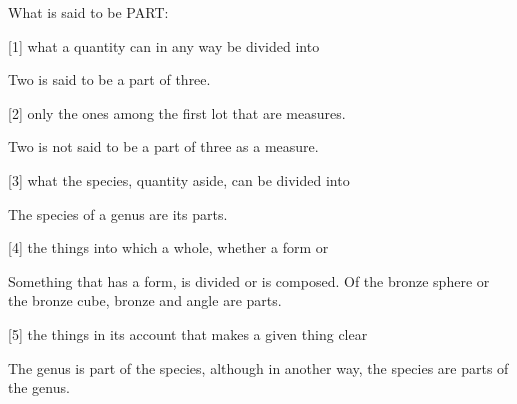 What is said to be PART:

[1]     what a quantity can in any way be divided into
 
        Two is said to be a part of three.

[2]     only the ones among the first lot that are measures.
 
        Two is not said to be a part of three as a measure.

[3]     what the species, quantity aside, can be divided into
 
        The species of a genus are its parts.

[4]     the things into which a whole, whether a form or

        Something that has a form, is divided or is composed.
        Of the bronze sphere or the bronze cube,
        bronze and angle are parts.

[5]     the things in its account that makes a given thing clear
 
        The genus is part of the species, although in another way,
        the species are parts of the genus.
